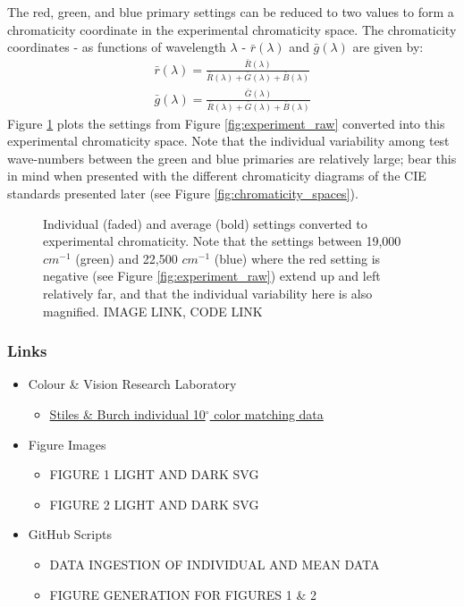 \documentclass[twocolumn]{article}
\newif\ifinvert
\begin{document}
The red, green, and blue primary settings can be reduced to two values to form a chromaticity coordinate in the experimental chromaticity space.  The chromaticity coordinates - as functions of wavelength $\lambda$ - $\bar{r}(\lambda)$ and $\bar{g}(\lambda)$ are given by:
\begin{equation}
    \begin{aligned}
        \bar{r}(\lambda)=\frac{\bar{R}(\lambda)}{\bar{R}(\lambda)+\bar{G}(\lambda)+\bar{B}(\lambda)}\\
        \bar{g}(\lambda)=\frac{\bar{G}(\lambda)}{\bar{R}(\lambda)+\bar{G}(\lambda)+\bar{B}(\lambda)}
    \end{aligned}
\end{equation}
Figure \ref{fig:experiment_chromaticity} plots the settings from Figure \ref{fig:experiment_raw} converted into this experimental chromaticity space.  Note that the individual variability among test wave-numbers between the green and blue primaries are relatively large; bear this in mind when presented with the different chromaticity diagrams of the CIE standards presented later (see Figure \ref{fig:chromaticity_spaces}).
\begin{figure}[h]
    \ifinvert
        
    \else
        
    \fi
    \caption{Individual (faded) and average (bold) settings converted to experimental chromaticity.  Note that the settings between 19,000 $cm^{-1}$ (green) and 22,500 $cm^{-1}$ (blue) where the red setting is negative (see Figure \ref{fig:experiment_raw}) extend up and left relatively far, and that the individual variability here is also magnified. IMAGE LINK, CODE LINK}\label{fig:experiment_chromaticity}
\end{figure}
\subsubsection{Links}
\begin{itemize}
    \item Colour \& Vision Research Laboratory
    \begin{itemize}
        \item \href{http://www.cvrl.org/stilesburch10_ind.htm}{Stiles \& Burch individual 10$^\circ$ color matching data}
    \end{itemize}
    \item Figure Images
    \begin{itemize}
        \item FIGURE 1 LIGHT AND DARK SVG
        \item FIGURE 2 LIGHT AND DARK SVG
    \end{itemize}
    \item GitHub Scripts
    \begin{itemize}
        \item DATA INGESTION OF INDIVIDUAL AND MEAN DATA
        \item FIGURE GENERATION FOR FIGURES 1 \& 2
    \end{itemize}
\end{itemize}
\end{document}
